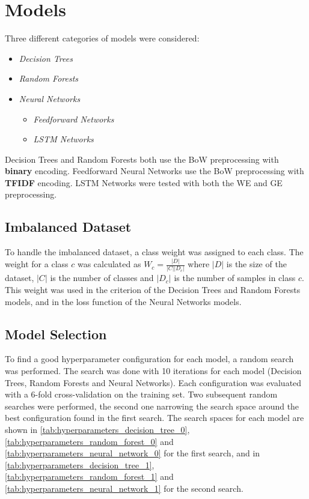 \section{Models}
\label{sec:models}
Three different categories of models were
considered:
\begin{itemize}
    \item \textit{Decision Trees}
    \item \textit{Random Forests}
    \item \textit{Neural Networks}
    \begin{itemize}
        \item \textit{Feedforward Networks}
        \item \textit{LSTM Networks}
    \end{itemize}
\end{itemize}
Decision Trees and Random Forests both use
the BoW preprocessing with \textbf{binary} 
encoding.
Feedforward Neural Networks use the BoW
preprocessing with \textbf{TFIDF} encoding.
LSTM Networks were tested with both the
WE and GE preprocessing.

\subsection{Imbalanced Dataset}
To handle the imbalanced dataset, a class
weight was assigned to each class. The weight
for a class $c$ was calculated as
$W_c=\frac{|D|}{|C||D_c|}$ where $|D|$ is
the size of the dataset, $|C|$ is the number
of classes and $|D_c|$ is the number of
samples in class $c$. This weight was used in
the criterion of the Decision Trees and Random
Forests models, and in the loss function of
the Neural Networks models.

\subsection{Model Selection}
To find a good hyperparameter configuration
for each model, a random search was performed.
The search was done with 10 iterations for
each model (Decision Trees, Random Forests 
and Neural Networks). Each configuration was
evaluated with a 6-fold cross-validation on
the training set. Two subsequent random
searches were performed, the second one
narrowing the search space around the best
configuration found in the first search.
The search spaces for each model are shown
in \autoref{tab:hyperparameters_decision_tree_0}, 
\autoref{tab:hyperparameters_random_forest_0} and 
\autoref{tab:hyperparameters_neural_network_0} for the 
first search, and in 
\autoref{tab:hyperparameters_decision_tree_1},
\autoref{tab:hyperparameters_random_forest_1} and
\autoref{tab:hyperparameters_neural_network_1} for the
second search.


